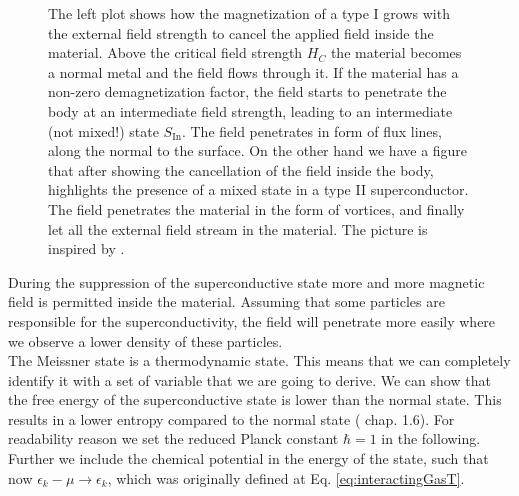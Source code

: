 \documentclass[../main.tex]{subfile}
\begin{document}
\begin{figure}[H]
        
            \caption{The left plot shows how the magnetization of a type I grows with the external field strength to cancel the applied field inside the material. Above
            the critical field strength $H_C$ the material becomes a normal metal and the field flows through it. If the material has a non-zero demagnetization factor,
            the field starts to penetrate the body at an intermediate field strength, leading to an intermediate (not mixed!) state $S_{\text{In}}$.
             The field penetrates in form of
            flux lines, along the normal to the surface. On the other hand we have a figure
            that after showing the cancellation of the field inside the body, highlights the presence of a mixed state in a type II superconductor. The field penetrates 
            the material in the form of vortices, and finally let all the external field stream in the material.
            The picture is inspired by \cite{FossheimSudbo2004}.}
        \end{figure}
During the suppression of the superconductive state more and more magnetic field 
is permitted inside the material. Assuming that some particles are responsible for the superconductivity, the field will penetrate more easily where we observe
a lower density of these particles.\\

The Meissner state is a thermodynamic state. This means that we can completely identify it with a set of variable that we are going to derive.
We can show that the free energy of the superconductive state is lower than the normal state. 
This results in a lower entropy compared to the normal state (\cite{FossheimSudbo2004} chap. 1.6).
For readability reason we set the reduced Planck constant $\hbar = 1$ in the following. Further we include the chemical potential in the energy of the state, such
that now $\epsilon_k - \mu \rightarrow \epsilon_k $, which was originally defined at Eq. \ref{eq:interactingGasT}.\\
\end{document}

